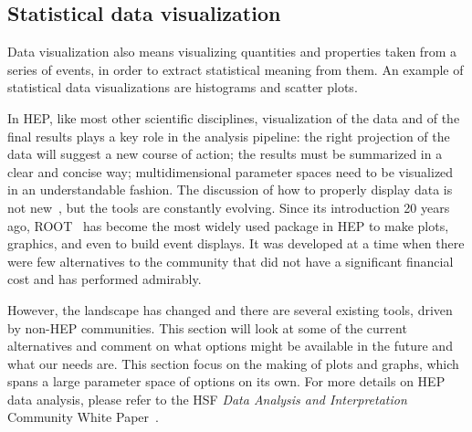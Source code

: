 \documentclass[12pt,a4paper]{article}
\begin{document}


\hypertarget{statistical-data-visualization}{%
\subsection{Statistical data visualization}\label{statistical-data-visualization}}

Data visualization also means visualizing quantities and properties taken from a series of events, in order to extract statistical
meaning from them. An example of statistical data visualizations are histograms and scatter plots.

In HEP, like most other scientific disciplines, visualization of the data and of the final results plays a key role in the
analysis pipeline: the right projection of the data will suggest a new course of action; the results must be summarized in a
clear and concise way; multidimensional parameter spaces need to be visualized in an understandable fashion. The discussion
of how to properly display data is not new~\cite{Tufte1986}, but the tools are constantly evolving. Since its introduction 20 years ago,
ROOT~\cite{Root1997} has become the most widely used package in HEP to make plots, graphics, and even to build event displays. It was developed at a
time when there were few alternatives to the community that did not have a significant financial cost and has performed admirably.

However, the landscape has changed and there are several existing tools, driven by non-HEP communities. This section will look at
some of the current alternatives and comment on what options might be available in the future and what our needs are. This section focus on the making of plots and graphs, which 
spans a large parameter space of options on its own. For more details on HEP data analysis, please refer to the HSF \emph{Data Analysis and Interpretation} Community White Paper~\cite{HSF-CWP-2017-05}.
\end{document}
